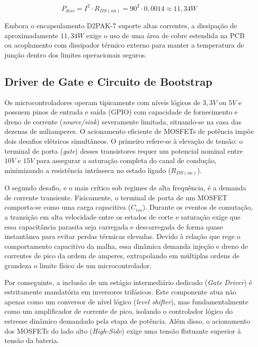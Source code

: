 \begin{equation}
    P_{diss} = I^2 \cdot R_{DS(on)} = 90^2 \cdot 0,0014 \approx 11,34 W
\end{equation}

Embora o encapsulamento D2PAK-7 suporte altas correntes, a dissipação de aproximadamente $11,34W$ exige o uso de uma área de cobre estendida na PCB ou acoplamento com dissipador térmico externo para manter a temperatura de junção dentro dos limites operacionais seguros.



\subsection{Driver de Gate e Circuito de Bootstrap}
Os microcontroladores operam tipicamente com níveis lógicos de $3,3 V$ ou $5 V$ e possuem pinos de entrada e saída (GPIO) com capacidade de fornecimento e dreno de corrente (\textit{source/sink}) severamente limitada, situando-se na casa das dezenas de miliamperes. O acionamento eficiente de MOSFETs de potência impõe dois desafios elétricos simultâneos. O primeiro refere-se à elevação de tensão: o terminal de porta (\textit{gate}) desses transistores requer um potencial nominal entre $10 V$ e $15 V$ para assegurar a saturação completa do canal de condução, minimizando a resistência intrínseca no estado ligado ($R_{DS(on)}$). 

O segundo desafio, e o mais crítico sob regimes de alta frequência, é a demanda de corrente transiente. Fisicamente, o terminal de porta de um MOSFET comporta-se como uma carga capacitiva ($C_{iss}$). Durante os eventos de comutação, a transição em alta velocidade entre os estados de corte e saturação exige que essa capacitância parasita seja carregada e descarregada de forma quase instantânea para evitar perdas térmicas elevadas. Devido à relação que rege o comportamento capacitivo da malha, essa dinâmica demanda injeção e dreno de correntes de pico da ordem de amperes, extrapolando em múltiplas ordens de grandeza o limite físico de um microcontrolador. 

Por conseguinte, a inclusão de um estágio intermediário dedicado (\textit{Gate Driver}) é estritamente mandatória em inversores trifásicos. Este componente atua não apenas como um conversor de nível lógico (\textit{level shifter}), mas fundamentalmente como um amplificador de corrente de pico, isolando o controlador lógico do estresse dinâmico demandado pela etapa de potência. Além disso, o acionamento dos MOSFETs do lado alto (\textit{High-Side}) exige uma tensão flutuante superior à tensão da bateria.

